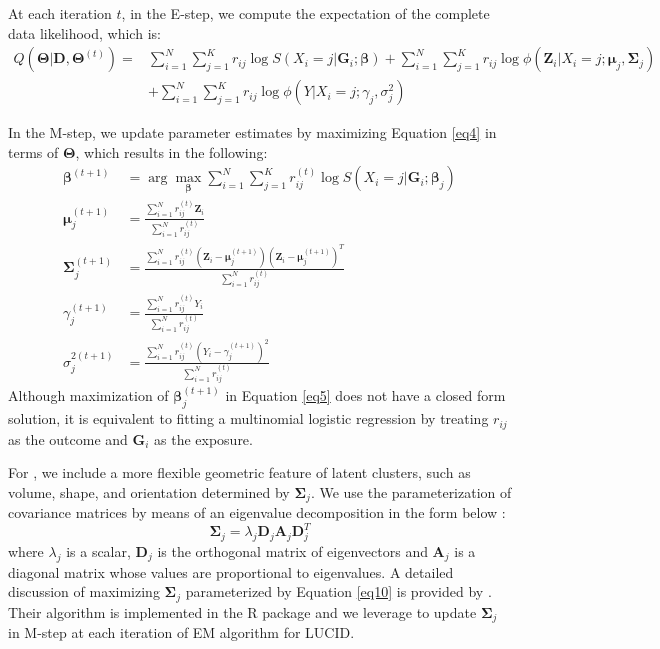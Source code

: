 At each iteration $t$, in the E-step, we compute the expectation of the complete data likelihood, which is:
\begin{equation}
    \begin{aligned}
        Q(\bm{\Theta}|\bm{D}, \bm{\Theta}^{(t)}) = & \sum_{i=1}^N\sum_{j=1}^K r_{ij} \log S\left(X_i = j|\bm{G}_i;\bm{\beta}\right) + \sum_{i=1}^N\sum_{j=1}^K r_{ij} \log \phi(\bm{Z}_i|X_i = j;\bm{\mu}_j, \bm{\Sigma}_j) \\
        & + \sum_{i=1}^N\sum_{j=1}^K r_{ij} \log \phi\left(Y|X_i = j; \gamma_j, \sigma_j^2\right)
    \end{aligned}
    \label{eq4}
\end{equation}

In the M-step, we update parameter estimates by maximizing Equation \ref{eq4} in terms of $\bm \Theta$, which results in the following:
\begin{align}
    \bm \beta^{(t+1)} & = \arg \max_{\bm \beta} \sum_{i=1}^N \sum_{j=1}^K r_{ij}^{(t)} \log S(X_i = j| \bm G_i; \bm \beta_j) \label{eq5} \\
    \bm \mu_j^{(t+1)} & = \frac{\sum_{i=1}^N r_{ij}^{(t)}\bm Z_i}{\sum_{i=1}^N r_{ij}^{(t)}} \label{eq6} \\
    \bm \Sigma_j^{(t+1)} & = \frac{\sum_{i=1}^N r_{ij}^{(t)} \left(\bm{Z}_i - \bm{\mu}_j^{(t+1)} \right) \left(\bm{Z}_i - \bm{\mu}_j^{(t+1)} \right)^T}{\sum_{i=1}^N r_{ij}^{(t)}} \label{eq7} \\
    \gamma_j^{(t+1)} & = \frac{\sum_{i=1}^N r_{ij}^{(t)}Y_i}{\sum_{i=1}^N r_{ij}^{(t)}} \label{eq8} \\
    \sigma_j^{2(t+1)} & = \frac{\sum_{i=1}^N r_{ij}^{(t)} \left(Y_i - \gamma_j^{(t+1)} \right)^2}{\sum_{i=1}^N r_{ij}^{(t)}} \label{eq9}
\end{align}
Although maximization of $\bm \beta_j^{(t+1)}$ in Equation \ref{eq5} does not have a closed form solution, it is equivalent to fitting a multinomial logistic regression by treating $r_{ij}$ as the outcome and $\bm G_i$ as the exposure.

For , we include a more flexible geometric feature of latent clusters, such as volume, shape, and orientation determined by $\bm \Sigma_j$.  We use the parameterization of covariance matrices by means of an eigenvalue decomposition in the form below \citep{banfield1993model}:
\begin{equation}
    \bm \Sigma_j = \lambda_j \bm D_j \bm A_j \bm D_j^T \label{eq10}
\end{equation}
where $\lambda_j$ is a scalar, $\bm D_j$ is the orthogonal matrix of eigenvectors and $\bm A_j$ is a diagonal matrix whose values are proportional to eigenvalues. A detailed discussion of maximizing $\bm \Sigma_j$ parameterized by Equation \ref{eq10} is provided by \citet{celeux1995gaussian}. Their algorithm is implemented in the R package  \citep{scrucca2016mclust} and we leverage  to update $\bm \Sigma_j$ in M-step at each iteration of EM algorithm for LUCID.

